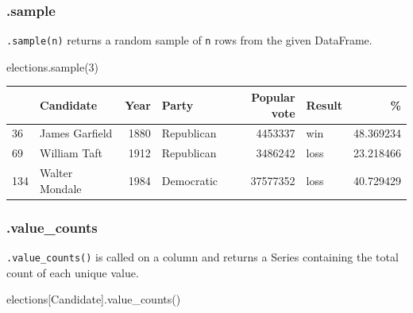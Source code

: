 \documentclass[
  letterpaper,
  DIV=11,
  numbers=noendperiod]{scrreprt}
\newenvironment{Shaded}{\begin{snugshade}}{\end{snugshade}}
\newcommand{\DecValTok}[1]{\textcolor[rgb]{0.68,0.00,0.00}{#1}}
\newcommand{\NormalTok}[1]{\textcolor[rgb]{0.00,0.23,0.31}{#1}}
\newcommand{\StringTok}[1]{\textcolor[rgb]{0.13,0.47,0.30}{#1}}
\begin{document}
\hypertarget{sample}{%
\subsubsection{.sample}\label{sample}}

\texttt{.sample(n)} returns a random sample of \texttt{n} rows from the
given DataFrame.

\begin{Shaded}
\begin{Highlighting}[]
\NormalTok{elections.sample(}\DecValTok{3}\NormalTok{)}
\end{Highlighting}
\end{Shaded}

\begin{tabular}{llrlrlr}
\toprule
{} &       Candidate &  Year &       Party &  Popular vote & Result &          \% \\
\midrule
36  &  James Garfield &  1880 &  Republican &       4453337 &    win &  48.369234 \\
69  &    William Taft &  1912 &  Republican &       3486242 &   loss &  23.218466 \\
134 &  Walter Mondale &  1984 &  Democratic &      37577352 &   loss &  40.729429 \\
\bottomrule
\end{tabular}

\hypertarget{value_counts}{%
\subsubsection{.value\_counts}\label{value_counts}}

\texttt{.value\_counts()} is called on a column and returns a Series
containing the total count of each unique value.

\begin{Shaded}
\begin{Highlighting}[]
\NormalTok{elections[}\StringTok{\textquotesingle{}Candidate\textquotesingle{}}\NormalTok{].value\_counts()}
\end{Highlighting}
\end{Shaded}
\end{document}
